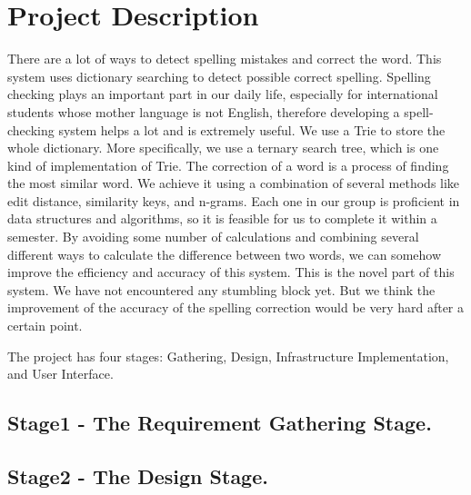 \documentclass[10pt,conference]{IEEEtran}
\begin{document}
\section{Project Description}\label{sec:1. Project Description}
\textnormal{
 There are a lot of ways to detect spelling mistakes and correct the word. This system uses dictionary searching to detect possible correct spelling. Spelling checking plays an important part in our daily life, especially for international students whose mother language is not English, therefore developing a spell-checking system helps a lot and is extremely useful. 
We use a Trie to store the whole dictionary. More specifically, we use a ternary search tree, which is one kind of implementation of Trie. The correction of a word is a process of finding the most similar word. We achieve it using a combination of several methods like edit distance, similarity keys, and n-grams. Each one in our group is proficient in data structures and algorithms, so it is feasible for us to complete it within a semester. 
By avoiding some number of calculations and combining several different ways to calculate the difference between two words, we can somehow improve the efficiency and accuracy of this system. This is the novel part of this system.
We have not encountered any stumbling block yet. But we think the improvement of the accuracy of the spelling correction would be very hard after a certain point.
}

The project has four stages: Gathering, Design, Infrastructure Implementation, and User Interface.

%
\subsection{Stage1 - The Requirement Gathering Stage. }\label{sec:1 Requirement Gathering Stage. }


\subsection{Stage2 - The Design Stage. }\label{sec: 2:The Design Stage.}

\end{document}
